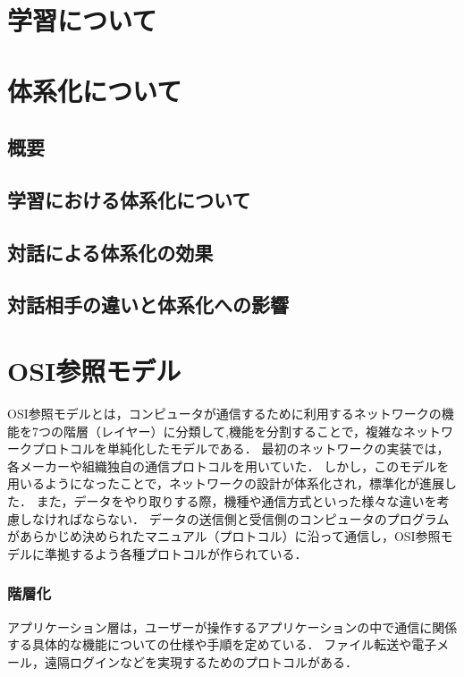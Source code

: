\documentclass[12pt,a4j,titlepage]{ltjsarticle}
\begin{document}


\clearpage

\section{学習について}\label{学習について}


\section{体系化について}
\subsection{概要}


\subsection{学習における体系化について}

\subsection{対話による体系化の効果}

\subsection{対話相手の違いと体系化への影響}

\section{OSI参照モデル}

OSI参照モデルとは，コンピュータが通信するために利用するネットワークの機能を7つの階層（レイヤー）に分類して,機能を分割することで，複雑なネットワークプロトコルを単純化したモデルである．
最初のネットワークの実装では，各メーカーや組織独自の通信プロトコルを用いていた．
しかし，このモデルを用いるようになったことで，ネットワークの設計が体系化され，標準化が進展した．
また，データをやり取りする際，機種や通信方式といった様々な違いを考慮しなければならない．
データの送信側と受信側のコンピュータのプログラムがあらかじめ決められたマニュアル（プロトコル）に沿って通信し，OSI参照モデルに準拠するよう各種プロトコルが作られている．

\subsubsection{階層化}
アプリケーション層は，ユーザーが操作するアプリケーションの中で通信に関係する具体的な機能についての仕様や手順を定めている．
ファイル転送や電子メール，遠隔ログインなどを実現するためのプロトコルがある．
\end{document}
